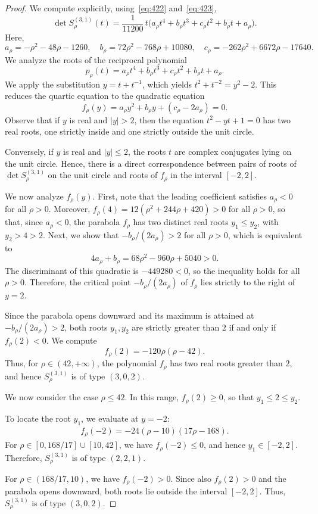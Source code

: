 \documentclass[10pt,a4paper]{amsart}
\newcommand{\SR}{S}
\renewcommand{\ge}{\geqslant}
\renewcommand{\le}{\leqslant}
\newcommand{\nf}{\infty}
\begin{document}
\begin{proof}
We compute explicitly, using~\eqref{eq:422} and~\eqref{eq:423},
\[
\det \SR_{\rho}^{(3,1)}(t)=\frac{1}{11200}\, t \big(a_{\rho} t^{4}+b_{\rho} t^{3}+c_{\rho} t^{2}+b_{\rho} t+a_{\rho}\big).
\]
Here,
\[
a_{\rho}=-\rho^{2}-48\rho-1260,\quad
b_{\rho}=72\rho^{2}-768\rho+10080,\quad
c_{\rho}=-262\rho^{2}+6672\rho-17640.
\]
We analyze the roots of the reciprocal polynomial
\[
p_{\rho}(t)=a_{\rho} t^{4}+b_{\rho} t^{3}+c_{\rho} t^{2}+b_{\rho} t+a_{\rho}.
\]
We apply the substitution $y=t+t^{-1}$, which yields $t^{2}+t^{-2}=y^{2}-2$.
This reduces the quartic equation to the quadratic equation
\[
f_{\rho}(y)=a_{\rho} y^{2}+b_{\rho} y+(c_{\rho}-2a_{\rho})=0.
\]
Observe that if $y$ is real and $|y|>2$, then the equation $t^{2}-y t+1=0$ has two real roots, one strictly inside and one strictly outside the unit circle.

Conversely, if $y$ is real and $|y|\le 2$, the roots $t$ are complex conjugates lying on the unit circle.
Hence, there is a direct correspondence between pairs of roots of $\det \SR_{\rho}^{(3,1)}$ on the unit circle and roots of $f_{\rho}$ in the interval $[-2,2]$.

We now analyze $f_{\rho}(y)$.
First, note that the leading coefficient satisfies $a_{\rho}<0$ for all $\rho>0$. Moreover, $f_{\rho}(4)=12(\rho^{2}+244\rho+420)>0$ for all $\rho>0$, so that, since $a_{\rho}<0$, the parabola $f_{\rho}$ has two distinct real roots $y_{1}\le y_{2}$, with $y_{2}>4>2$.
Next, we show that $-b_{\rho}/(2a_{\rho})>2$ for all $\rho>0$, which is equivalent to
\[
4a_{\rho}+b_{\rho}=68\rho^{2}-960\rho+5040>0.
\]
The discriminant of this quadratic is $-449280<0$, so the inequality holds for all $\rho>0$.
Therefore, the critical point $-b_{\rho}/(2a_{\rho})$ of $f_{\rho}$ lies strictly to the right of $y=2$.

Since the parabola opens downward and its maximum is attained at $-b_{\rho}/(2a_{\rho})>2$, both roots $y_{1},y_{2}$ are strictly greater than $2$ if and only if $f_{\rho}(2)<0$.
We compute
\[
f_{\rho}(2)=-120\rho(\rho-42).
\]
Thus, for $\rho\in (42,+\nf)$, the polynomial $f_{\rho}$ has two real roots greater than $2$, and hence $\SR_{\rho}^{(3,1)}$ is of type $(3,0,2)$.

We now consider the case $\rho\le 42$.
In this range, $f_{\rho}(2)\ge 0$, so that $y_{1}\le 2\le y_{2}$.

To locate the root $y_{1}$, we evaluate at $y=-2$:
\begin{align*}
f_{\rho}(-2)=-24(\rho-10)(17\rho-168).
\end{align*}
For $\rho\in [0,168/17]\cup [10,42]$, we have $f_{\rho}(-2)\le 0$, and hence $y_{1}\in [-2,2]$.
Therefore, $\SR_{\rho}^{(3,1)}$ is of type $(2,2,1)$.

For $\rho\in (168/17,10)$, we have $f_{\rho}(-2)>0$.
Since also $f_{\rho}(2)>0$ and the parabola opens downward, both roots lie outside the interval $[-2,2]$.
Thus, $\SR_{\rho}^{(3,1)}$ is of type $(3,0,2)$.
\end{proof}
\end{document}
